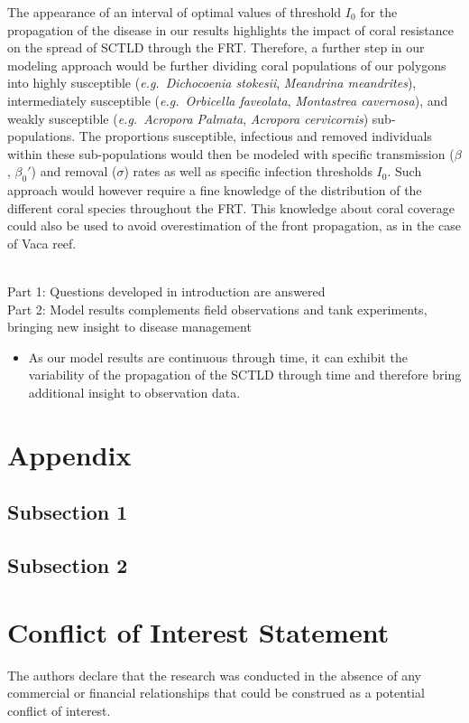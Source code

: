 \documentclass[utf8]{frontiersSCNS}
\newcommand{\eg}{{\it e.g.}\ }
\newcommand{\dobby}[1]{\textbf{\color{violet}{#1}}}
\begin{document}
The appearance of an interval of optimal values of threshold $I_0$ for the propagation of the disease in our results highlights the impact of coral resistance on the spread of SCTLD through the FRT. Therefore, a further step in our modeling approach would be further dividing coral populations of our polygons into highly susceptible (\eg \textit{Dichocoenia stokesii}, \textit{Meandrina meandrites}), intermediately susceptible (\eg \textit{Orbicella faveolata}, \textit{Montastrea cavernosa}), and weakly susceptible (\eg \textit{Acropora Palmata}, \textit{Acropora cervicornis}) sub-populations. The proportions susceptible, infectious and removed individuals within these sub-populations would then be modeled with specific transmission ($\beta$, $\beta_0'$) and removal ($\sigma$) rates as well as specific infection thresholds $I_0$. Such approach would however require a fine knowledge of the distribution of the different coral species throughout the FRT. This knowledge about coral coverage could also be used to avoid overestimation of the front propagation, as in the case of Vaca reef.

\dobby{TO DO: Conclusion} \\
Part 1: Questions developed in introduction are answered\\
Part 2: Model results complements field observations and tank experiments, bringing new insight to disease management
\begin{itemize}
    \item As our model results are continuous through time, it can exhibit the variability of the propagation of the SCTLD through time and therefore bring additional insight to observation data.
\end{itemize}
\section*{Appendix}

\subsection*{Subsection 1}
\subsection*{Subsection 2}

\section*{Conflict of Interest Statement}
The authors declare that the research was conducted in the absence of any commercial or financial relationships that could be construed as a potential conflict of interest.
\end{document}
